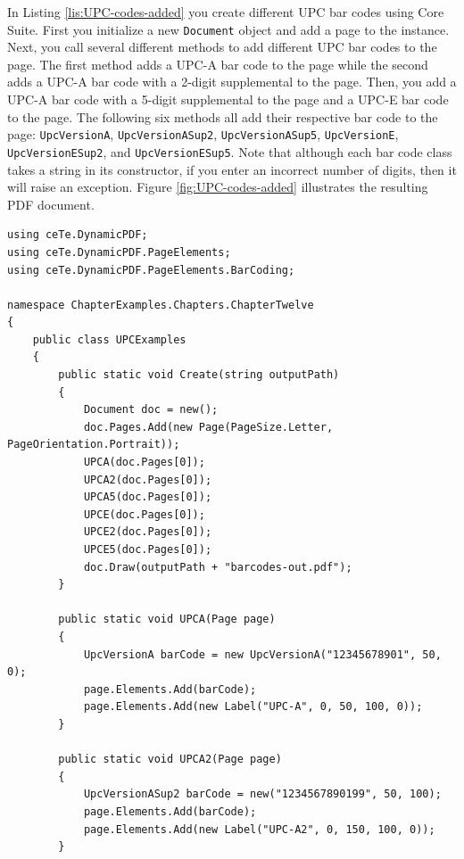 \documentclass[american]{tufte-book}
\numberwithin{equation}{section}
\numberwithin{figure}{section}
\begin{document}
{In Listing \ref{lis:UPC-codes-added} you create different UPC bar
codes using Core Suite. First you initialize a new \texttt{Document}
object and add a page to the instance. Next, you call several different
methods to add different UPC bar codes to the page. The first method
adds a UPC-A bar code to the page while the second adds a UPC-A bar
code with a 2-digit supplemental to the page. Then, you add a UPC-A
bar code with a 5-digit supplemental to the page and a UPC-E bar code
to the page. The following six methods all add their respective bar
code to the page: \texttt{UpcVersionA}, \texttt{UpcVersionASup2},
\texttt{UpcVersionASup5}, \texttt{UpcVersionE}, \texttt{UpcVersionESup2},
and \texttt{UpcVersionESup5}. Note that although each bar code class
takes a string in its constructor, if you enter an incorrect number
of digits, then it will raise an exception. Figure \ref{fig:UPC-codes-added}
illustrates the resulting PDF document.

\bgroup{}
\begin{lstlisting}[caption={UPC codes added to a PDF document.},label={lis:UPC-codes-added},basicstyle={\footnotesize\ttfamily},breaklines=true]
using ceTe.DynamicPDF;
using ceTe.DynamicPDF.PageElements;
using ceTe.DynamicPDF.PageElements.BarCoding;

namespace ChapterExamples.Chapters.ChapterTwelve
{
    public class UPCExamples
    {
        public static void Create(string outputPath)
        {
            Document doc = new();
            doc.Pages.Add(new Page(PageSize.Letter, PageOrientation.Portrait));
            UPCA(doc.Pages[0]);
            UPCA2(doc.Pages[0]);
            UPCA5(doc.Pages[0]);
            UPCE(doc.Pages[0]);
            UPCE2(doc.Pages[0]);
            UPCE5(doc.Pages[0]);
            doc.Draw(outputPath + "barcodes-out.pdf");
        }

        public static void UPCA(Page page)
        {
            UpcVersionA barCode = new UpcVersionA("12345678901", 50, 0);
            page.Elements.Add(barCode);
            page.Elements.Add(new Label("UPC-A", 0, 50, 100, 0));
        } 

        public static void UPCA2(Page page)
        {
            UpcVersionASup2 barCode = new("1234567890199", 50, 100);
            page.Elements.Add(barCode);
            page.Elements.Add(new Label("UPC-A2", 0, 150, 100, 0));
        }


\end{lstlisting}}
\end{document}

